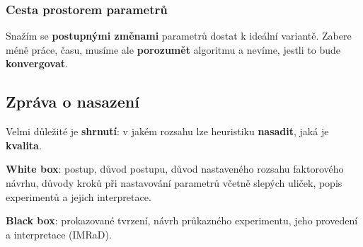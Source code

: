 \subsubsection{Cesta prostorem parametrů}

Snažím se \textbf{postupnými změnami} parametrů dostat k ideální variantě. Zabere méně práce, času, musíme ale \textbf{porozumět} algoritmu a nevíme, jestli to bude \textbf{konvergovat}.

\subsection{Zpráva o nasazení}

Velmi důležité je \textbf{shrnutí}: v jakém rozsahu lze heuristiku \textbf{nasadit}, jaká je \textbf{kvalita}.

\vspace{4pt}
\noindent \textbf{White box}: postup, důvod postupu, důvod nastaveného rozsahu faktorového návrhu, důvody kroků při nastavování parametrů včetně slepých uliček, popis experimentů a jejich interpretace.

\vspace{4pt}
\noindent \textbf{Black box}: prokazované tvrzení, návrh průkazného experimentu, jeho provedení a interpretace (IMRaD).

